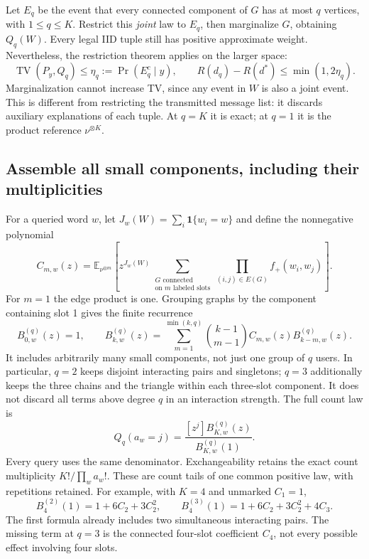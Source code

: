 \documentclass[10pt,a4paper]{article}
\newcommand{\E}{\mathbb E}
\newcommand{\ind}{\mathbf 1}
\newcommand{\TV}{\operatorname{TV}}
\begin{document}
Let $E_q$ be the event that every connected component of $G$ has at most $q$ vertices, with $1\leq q\leq K$.
Restrict this \emph{joint} law to $E_q$, then marginalize $G$, obtaining $Q_q(W)$. Every legal IID tuple
still has positive approximate weight. Nevertheless, the restriction theorem applies on the larger space:
\begin{equation}
 \TV(P_y,Q_q)\leq\eta_q:=\Pr(E_q^c\mid y),\qquad
 R(d_q)-R(d^*)\leq\min(1,2\eta_q).
 \label{eq:cluster-restriction}
\end{equation}
Marginalization cannot increase TV, since any event in $W$ is also a joint event. This is different from
restricting the transmitted message list: it discards auxiliary explanations of each tuple. At $q=K$ it
is exact; at $q=1$ it is the product reference $\nu^{\otimes K}$.

\subsection{Assemble all small components, including their multiplicities}
For a queried word $w$, let $J_w(W)=\sum_i\ind\{w_i=w\}$ and define the nonnegative polynomial
\[
 C_{m,w}(z)=\E_{\nu^{\otimes m}}\!\left[
 z^{J_w(W)}\sum_{\substack{G\text{ connected}\\\text{on }m\text{ labeled slots}}}
       \prod_{(i,j)\in E(G)}f_+(w_i,w_j)\right].
\]
For $m=1$ the edge product is one. Grouping graphs by the component containing slot 1 gives the finite
recurrence
\begin{equation}
 B^{(q)}_{0,w}(z)=1,\qquad
 B^{(q)}_{k,w}(z)=\sum_{m=1}^{\min(k,q)}\binom{k-1}{m-1}
                 C_{m,w}(z)B^{(q)}_{k-m,w}(z).
 \label{eq:positive-cluster-assembly}
\end{equation}
It includes arbitrarily many small components, not just one group of $q$ users. In particular, $q=2$
keeps disjoint interacting pairs and singletons; $q=3$ additionally keeps the three chains and the triangle
within each three-slot component. It does not discard all terms above degree $q$ in an interaction strength.
The full count law is
\[
 Q_q(a_w=j)=\frac{[z^j]B^{(q)}_{K,w}(z)}{B^{(q)}_{K,w}(1)}.
\]
Every query uses the same denominator. Exchangeability retains the exact count multiplicity
$K!/\prod_w a_w!$. These are count tails of one common positive law, with repetitions retained.
For example, with $K=4$ and unmarked $C_1=1$,
\[
 B_4^{(2)}(1)=1+6C_2+3C_2^2,\qquad
 B_4^{(3)}(1)=1+6C_2+3C_2^2+4C_3.
\]
The first formula already includes two simultaneous interacting pairs. The missing term at $q=3$ is
the connected four-slot coefficient $C_4$, not every possible effect involving four slots.
\end{document}
